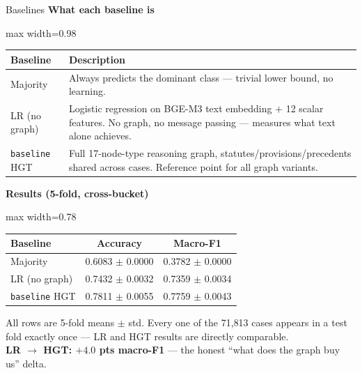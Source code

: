 \documentclass[aspectratio=169,11pt]{beamer}
\newcommand{\highlight}[1]{\textcolor{ThesisBlue}{\textbf{#1}}}
\begin{document}
\begin{frame}{Baselines}
  \scriptsize
  \centering
  \textbf{What each baseline is}\\[0.25em]
  \begin{adjustbox}{max width=0.98\textwidth}
    \begin{tabular}{p{2.4cm}p{11.0cm}}
      \toprule
      \textbf{Baseline} & \textbf{Description} \\
      \midrule
      Majority & Always predicts the dominant class --- trivial lower bound, no learning. \\
      LR (no graph) & Logistic regression on BGE-M3 text embedding $+$ 12 scalar features. No graph, no message passing --- measures what text alone achieves. \\
      \texttt{baseline} HGT & Full 17-node-type reasoning graph, statutes/provisions/precedents shared across cases. Reference point for all graph variants. \\
      \bottomrule
    \end{tabular}
  \end{adjustbox}

  \vspace{0.8em}
  \textbf{Results (5-fold, cross-bucket)}\\[0.25em]
  \begin{adjustbox}{max width=0.78\textwidth}
    \begin{tabular}{lcc}
      \toprule
      \textbf{Baseline} & \textbf{Accuracy} & \textbf{Macro-F1} \\
      \midrule
      Majority           & 0.6083 $\pm$ 0.0000 & 0.3782 $\pm$ 0.0000 \\
      LR (no graph)      & 0.7432 $\pm$ 0.0032 & 0.7359 $\pm$ 0.0034 \\
      \texttt{baseline} HGT & 0.7811 $\pm$ 0.0055 & 0.7759 $\pm$ 0.0043 \\
      \bottomrule
    \end{tabular}
  \end{adjustbox}

  \vspace{0.5em}
  \scriptsize All rows are 5-fold means $\pm$ std. Every one of the 71{,}813 cases appears in a test fold exactly once --- LR and HGT results are directly comparable.\\[0.25em]
  \highlight{LR $\rightarrow$ HGT: $+4.0$ pts macro-F1} --- the honest ``what does the graph buy us'' delta.
\end{frame}
\end{document}
